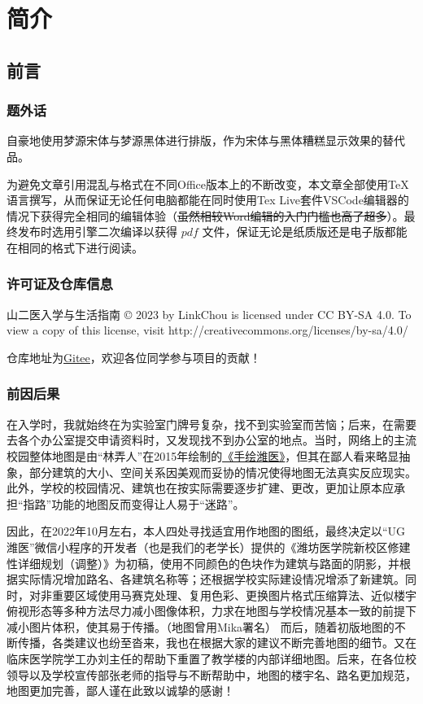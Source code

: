 \chapter[简介]{简介}

\section[前言]{前言}
\subsection[题外话]{题外话}
自豪地使用梦源宋体与梦源黑体进行排版，作为宋体与黑体糟糕显示效果的替代品。

为避免文章引用混乱与格式在不同Office版本上的不断改变，本文章全部使用\TeX 语言撰写，从而保证无论任何电脑都能在同时使用Tex Live套件VSCode编辑器\footnotemark 的情况下获得完全相同的编辑体验（\sout{虽然相较Word编辑的入门门槛也高了超多}）。最终发布时选用\XeLaTeX 引擎二次编译以获得 $pdf$ 文件，保证无论是纸质版还是电子版都能在相同的格式下进行阅读。

\subsection[许可证及仓库信息]{许可证及仓库信息}
山二医入学与生活指南 © 2023 by LinkChou is licensed under CC BY-SA 4.0. To view a copy of this license, visit http://creativecommons.org/licenses/by-sa/4.0/

仓库地址为\uline{\href{https://gitee.com/mikazo/guide_for_freshman}{Gitee}}，欢迎各位同学参与项目的贡献！

\subsection[前因后果]{前因后果}
在入学时，我就始终在为实验室门牌号复杂，找不到实验室而苦恼；后来，在需要去各个办公室提交申请资料时，又发现找不到办公室的地点。当时，网络上的主流校园整体地图是由“林弄人”在2015年绘制的\uline{\href{https://www.zcool.com.cn/work/ZMTgxMDQwMjg=.html?}{《手绘潍医》}}，但其在鄙人看来略显抽象，部分建筑的大小、空间关系因美观而妥协的情况使得地图无法真实反应现实。
此外，学校的校园情况、建筑也在按实际需要逐步扩建、更改，更加让原本应承担“指路”功能的地图反而变得让人易于“迷路”。

因此，在2022年10月左右，本人四处寻找适宜用作地图的图纸，最终决定以“UG潍医”微信小程序的开发者（也是我们的老学长）提供的《潍坊医学院新校区修建性详细规划（调整）》为初稿，使用不同颜色的色块作为建筑与路面的阴影，并根据实际情况增加路名、各建筑名称等；还根据学校实际建设情况增添了新建筑。同时，对非重要区域使用马赛克处理、复用色彩、更换图片格式压缩算法、近似楼宇俯视形态等多种方法尽力减小图像体积，力求在地图与学校情况基本一致的前提下减小图片体积，使其易于传播。（地图曾用Mika署名）
而后，随着初版地图的不断传播，各类建议也纷至沓来，我也在根据大家的建议不断完善地图的细节。又在临床医学院学工办刘主任的帮助下重置了教学楼的内部详细地图。后来，在各位校领导以及学校宣传部张老师的指导与不断帮助中，地图的楼宇名、路名更加规范，地图更加完善，鄙人谨在此致以诚挚的感谢！

